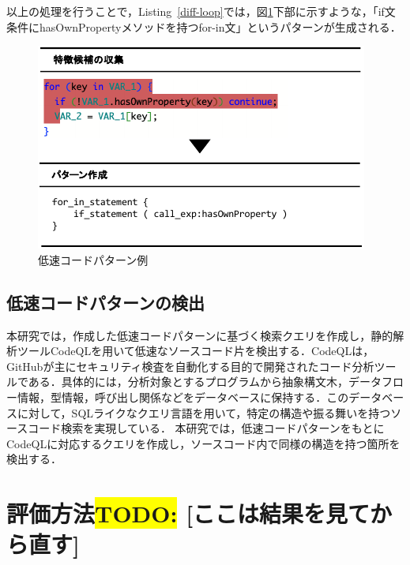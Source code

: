 \documentclass[submit,techrep,noauthor]{ipsj}
\newcommand{\todo}[1]{\colorbox{yellow}{{\bf TODO}:}{\color{red} {\textbf{[#1]}}}}
\begin{document}
以上の処理を行うことで，Listing~\ref{diff-loop}では，図\ref{fig:slow_pattern}下部に示すような，「if文条件にhasOwnPropertyメソッドを持つfor-in文」というパターンが生成される．

\begin{figure}[t]
    \centering
    \includegraphics[width=0.9\linewidth]{./Noguchi_fig/slow_pattern.pdf}
    \caption{低速コードパターン例}
    \label{fig:slow_pattern}
\end{figure}

\subsection{低速コードパターンの検出}

本研究では，作成した低速コードパターンに基づく検索クエリを作成し，静的解析ツールCodeQL\cite{ql}を用いて低速なソースコード片を検出する．CodeQLは，GitHubが主にセキュリティ検査を自動化する目的で開発されたコード分析ツールである．具体的には，分析対象とするプログラムから抽象構文木，データフロー情報，型情報，呼び出し関係などをデータベースに保持する．このデータベースに対して，SQLライクなクエリ言語を用いて，特定の構造や振る舞いを持つソースコード検索を実現している．
本研究では，低速コードパターンをもとにCodeQLに対応するクエリを作成し，ソースコード内で同様の構造を持つ箇所を検出する．


\section{評価方法\todo{ここは結果を見てから直す}}
\label{sec:evaluation}
\end{document}
